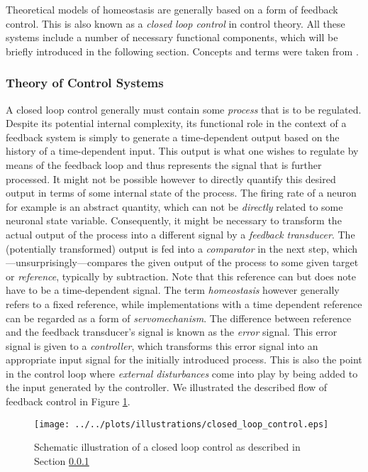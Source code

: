 \documentclass[10pt,a4paper]{article}
\begin{document}
Theoretical models of homeostasis are generally based on a form of feedback control. This is also known as a \textit{closed loop control} in control theory. All these systems include a number of necessary functional components, which will be briefly introduced in the following section. Concepts and terms were taken from \cite[p. 59-64]{Cybernetik_Systems_Cruse_2006}.

\pagebreak

\subsubsection{Theory of Control Systems} \label{Control_Sys_Theo_Section}
A closed loop control generally must contain some \emph{process} that is to be regulated. Despite its potential internal complexity, its functional role in the context of a feedback system is simply to generate a time-dependent output based on the history of a time-dependent input. This output is what one wishes to regulate by means of the feedback loop and thus represents the signal that is further processed. It might not be possible however to directly quantify this desired output in terms of some internal state of the process. The firing rate of a neuron for example is an abstract quantity, which can not be \emph{directly} related to some neuronal state variable. Consequently, it might be necessary to transform the actual output of the process into a different signal by a \textit{feedback transducer}. The (potentially transformed) output is fed into a \textit{comparator} in the next step, which---unsurprisingly---compares the given output of the process to some given target or \textit{reference}, typically by subtraction. Note that this reference can but does note have to be a time-dependent signal. The term \textit{homeostasis} however generally refers to a fixed reference, while implementations with a time dependent reference can be regarded as a form of \textit{servomechanism}. The difference between reference and the feedback transducer's signal is known as the \textit{error} signal. This error signal is given to a \textit{controller}, which transforms this error signal into an appropriate input signal for the initially introduced process. This is also the point in the control loop where \textit{external disturbances} come into play by being added to the input generated by the controller. We illustrated the described flow of feedback control in Figure \ref{Closed_Loop_Control_Illustration}.
\begin{figure}
\begin{center}
\texttt{[image: ../../plots/illustrations/closed\_loop\_control.eps]}
\end{center}
\caption[Schematic illustration of a closed loop control]{Schematic illustration of a closed loop control as described in Section \ref{Control_Sys_Theo_Section}}
\label{Closed_Loop_Control_Illustration}
\end{figure}
\end{document}
